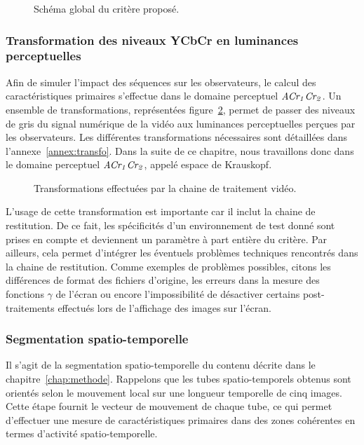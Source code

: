 \begin{figure}[htbp]
	\centering
	\begin{tikzpicture}[node distance = 2cm, auto, text width=2cm, text centered]
	
	\end{tikzpicture}
	\caption{Schéma global du critère proposé.}
  \label{fig:schemaModeleVideoDistorsionsIntraTubes}
\end{figure}


\subsubsection{Transformation des niveaux YCbCr en luminances perceptuelles}
Afin de simuler l'impact des séquences sur les observateurs, le calcul des caractéristiques primaires s'effectue dans le domaine perceptuel $\ACrCr$. Un ensemble de transformations, représentées figure~\ref{fig:transfoCouleurs}, permet de passer des niveaux de gris du signal numérique de la vidéo aux luminances perceptuelles perçues par les observateurs. Les différentes transformations nécessaires sont détaillées dans l'annexe~\ref{annex:transfo}. Dans la suite de ce chapitre, nous travaillons donc dans le domaine perceptuel $\ACrCr$, appelé espace de Krauskopf.

\begin{figure}[htbp]
	\centering
	\begin{tikzpicture}[node distance=3cm, text centered, text width=5em, minimum height=2em]\end{tikzpicture}
	\caption{Transformations effectuées par la chaine de traitement vidéo.}
	\label{fig:transfoCouleurs}
\end{figure}

L'usage de cette transformation est importante car il inclut la chaine de restitution. De ce fait, les spécificités d'un environnement de test donné sont prises en compte et deviennent un paramètre à part entière du critère. Par ailleurs, cela permet d'intégrer les éventuels problèmes techniques rencontrés dans la chaine de restitution. Comme exemples de problèmes possibles, citons les différences de format des fichiers d'origine, les erreurs dans la mesure des fonctions $\gamma$ de l'écran ou encore l'impossibilité de désactiver certains post-traitements effectués lors de l'affichage des images sur l'écran.


\subsubsection{Segmentation spatio-temporelle}
Il s'agit de la segmentation spatio-temporelle du contenu décrite dans le chapitre~\ref{chap:methode}. Rappelons que les tubes spatio-temporels obtenus sont orientés selon le mouvement local sur une longueur temporelle de cinq images. Cette étape fournit le vecteur de mouvement de chaque tube, ce qui permet d'effectuer une mesure de caractéristiques primaires dans des zones cohérentes en termes d'activité spatio-temporelle.


